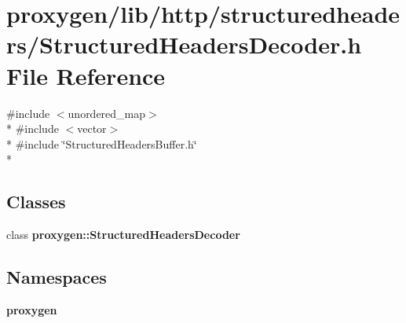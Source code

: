 \section{proxygen/lib/http/structuredheaders/\+Structured\+Headers\+Decoder.h File Reference}
\label{StructuredHeadersDecoder_8h}
{\ttfamily \#include $<$unordered\+\_\+map$>$}\\*
{\ttfamily \#include $<$vector$>$}\\*
{\ttfamily \#include \char`\"{}Structured\+Headers\+Buffer.\+h\char`\"{}}\\*
\subsection*{Classes}
\begin{DoxyCompactItemize}
\item 
class {\bf proxygen\+::\+Structured\+Headers\+Decoder}
\end{DoxyCompactItemize}
\subsection*{Namespaces}
\begin{DoxyCompactItemize}
\item 
 {\bf proxygen}
\end{DoxyCompactItemize}
